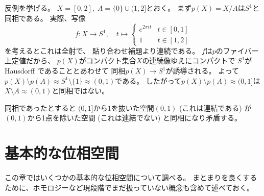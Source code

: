 \documentclass[report]{jlreq}
\begin{document}

\begin{answer}
    反例を挙げる。
    $X = [0, 2], \; A = \{ 0 \} \cup (1, 2]$とおく。
    まず$p(X) = X / A$は$S^1$と同相である。
    実際、写像
    \begin{equation}
        f \colon X \to S^1,
        \quad
        t \mapsto \begin{cases}
            e^{2\pi it} & t \in [0, 1] \\
            1 & t \in [1, 2]
        \end{cases}
    \end{equation}
    を考えるとこれは全射で、
    貼り合わせ補題より連続である。
    $f$は$p$のファイバー上定値だから、
    $p(X)$がコンパクト集合$X$の連続像ゆえにコンパクトで
    $S^1$が Hausdorff であることとあわせて
    同相$p(X) \to S^1$が誘導される。
    よって$p(X) \setminus p(A)
        \approx S^1 \setminus \{ 1 \}
        \approx (0, 1)$である。
    したがって$p(X) \setminus p(A) \approx (0, 1]$は
    $X \setminus A \approx (0, 1)$と同相ではない。
    \begin{innerproof}
        同相であったとすると
        $(0, 1]$から$1$を抜いた空間$(0, 1)$ (これは連結である) が
        $(0, 1)$から1点を除いた空間 (これは連結でない) と同相になり矛盾する。
    \end{innerproof}
\end{answer}






%
\chapter{基本的な位相空間}

この章ではいくつかの基本的な位相空間について調べる。
まとまりを良くするために、ホモロジーなど現段階でまだ扱っていない概念も含めて述べておく。

%
\end{document}

